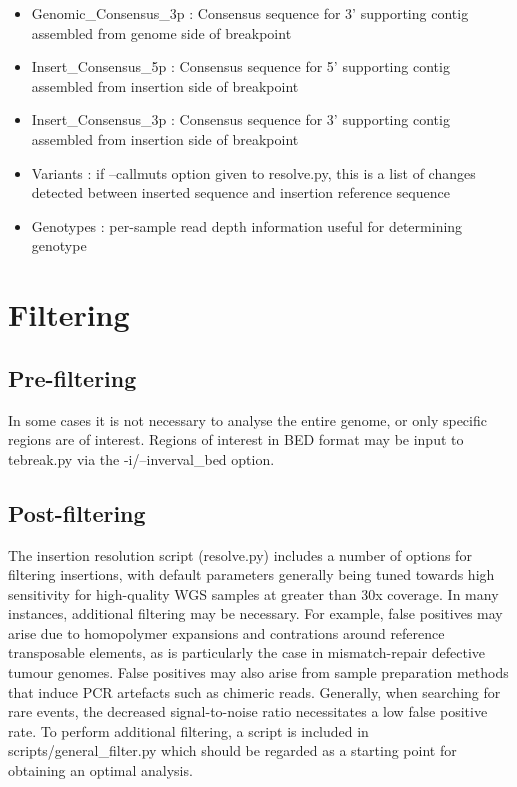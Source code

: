 \documentclass[letterpaper,11pt]{article}
\begin{document}
\begin{itemize}
\item Genomic\_Consensus\_3p : Consensus sequence for 3' supporting contig assembled from genome side of breakpoint
\item Insert\_Consensus\_5p : Consensus sequence for 5' supporting contig assembled from insertion side of breakpoint
\item Insert\_Consensus\_3p : Consensus sequence for 3' supporting contig assembled from insertion side of breakpoint
\item Variants : if --callmuts option given to resolve.py, this is a list of changes detected between inserted sequence and insertion reference sequence
\item Genotypes : per-sample read depth information useful for determining genotype
\end{itemize}

\section{Filtering}


\subsection{Pre-filtering}
In some cases it is not necessary to analyse the entire genome, or only specific regions are of interest. Regions of interest in BED format may be input to tebreak.py via the -i/--inverval\_bed option.


\subsection{Post-filtering}
The insertion resolution script (resolve.py) includes a number of options for filtering insertions, with default parameters generally being tuned towards high sensitivity for high-quality WGS samples at greater than 30x coverage. In many instances, additional filtering may be necessary. For example, false positives may arise due to homopolymer expansions and contrations around reference transposable elements, as is particularly the case in mismatch-repair defective tumour genomes. False positives may also arise from sample preparation methods that induce PCR artefacts such as chimeric reads. Generally, when searching for rare events, the decreased signal-to-noise ratio necessitates a low false positive rate. To perform additional filtering, a script is included in scripts/general\_filter.py which should be regarded as a starting point for obtaining an optimal analysis.
\end{document}
